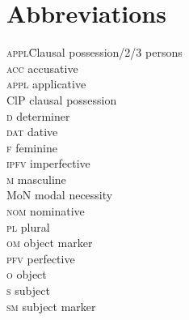 \documentclass[output=paper]{langscibook}
\begin{document}
\section*{Abbreviations}
\begin{multicols}{3}
\begin{tabbing}
{\scshape appl}\hspace{1em}\=Clausal possession/2/3 \> persons\\ 
{\scshape acc} \>  accusative\\
{\scshape appl} \> applicative\\ 
ClP \>  clausal possession\\ 
{\scshape d} \> determiner\\ 
{\scshape dat} \> dative\\ 
{\scshape f} \> feminine\\ 
{\scshape ipfv} \> imperfective\\ 
{\scshape m} \> masculine\\ 
MoN \> modal necessity\\ 
{\scshape nom} \> nominative\\ 
{\scshape pl} \> plural\\ 
{\scshape om}  \>  object marker\\ 
{\scshape pfv} \> perfective\\ 
{\scshape o} \> object\\ 
{\scshape s} \> subject\\ 
{\scshape sm} \> subject marker
\end{tabbing}
\end{multicols}

{\sloppy\printbibliography[heading=subbibliography,notkeyword=this]}
\end{document}
